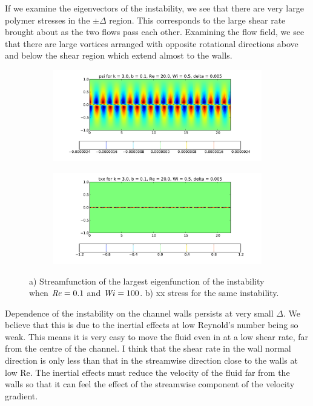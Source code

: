 \documentclass{jfm}
\newcommand\Wi{\mbox{\textit{Wi}}}
\newcommand\Rey{\mbox{\textit{Re}}}  %
\begin{document}
If we examine the eigenvectors of the instability, we see that there are very large polymer stresses in the $\pm \Delta$ region. This corresponds to the large shear rate brought about as the two flows pass each other. Examining the flow field, we see that there are large vortices arranged with opposite rotational directions above and below the shear region which extend almost to the walls. 

\begin{figure}
    \begin{subfigure}[b]{\textwidth}
    \centering
    \includegraphics[width=\textwidth]{psi_low_delta}
    \caption{}
    \label{fig:psi_low_delta}
    \end{subfigure}
    \vspace{1 mm}
    \begin{subfigure}[b]{\textwidth}
    \centering
    \includegraphics[width=\textwidth]{txx_low_delta}
    \caption{}
    \label{fig:stress_low_delta}
    \end{subfigure}
    \caption{a) Streamfunction of the largest eigenfunction of the instability when $\Rey = 0.1$ and $\Wi =100$. b) xx stress for the same instability.}
\end{figure}

Dependence of the instability on the channel walls persists at very small $\Delta$. We believe that this is due to the inertial effects at low Reynold's number being so weak. This means it is very easy to move the fluid even in at a low shear rate, far from the centre of the channel. I think that the shear rate in the wall normal direction is only less than that in the streamwise direction close to the walls at low Re. The inertial effects must reduce the velocity of the fluid far from the walls so that it can feel the effect of the streamwise component of the velocity gradient.
\end{document}
